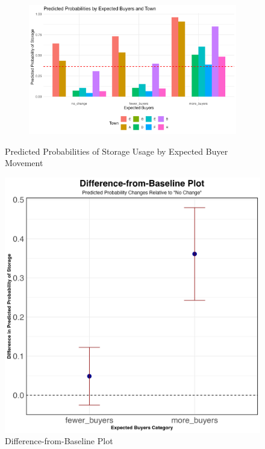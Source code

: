 \begin{figure}[htbp]
    \begin{subfigure}{\textwidth}
        \centering
        \includegraphics[height=0.28\textheight]{figures/predicted_probs_by_town.png}
        \caption{}
    \end{subfigure}


    \caption{Predicted Probabilities of Storage Usage by Expected Buyer Movement}
    \label{fig:three-images}
\end{figure}





\begin{figure}[ht]
    \centering
    \includegraphics[width=1\textwidth]{figures/filtered_difference_from_baseline_plot.png}
    \caption{Difference-from-Baseline Plot}
    \label{Figure: Difference-from-Baseline Plot}
\end{figure}



